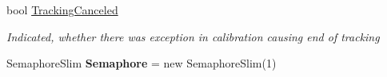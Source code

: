 \begin{DoxyCompactItemize}
bool \mbox{\hyperlink{class_chess_tracking_1_1_image_processing_1_1_pipeline_parts_1_1_general_1_1_pipeline_a7c72e9604390f31fddc8380d42569575}{Tracking\+Canceled}}
\begin{DoxyCompactList}\small\item\em Indicated, whether there was exception in calibration causing end of tracking \end{DoxyCompactList}\item 
\mbox{\label{class_chess_tracking_1_1_image_processing_1_1_pipeline_parts_1_1_general_1_1_pipeline_ae85e486e4a3d07e92bc93ad430a2d12a}} 
Semaphore\+Slim {\bfseries Semaphore} = new Semaphore\+Slim(1)
\end{DoxyCompactItemize}
